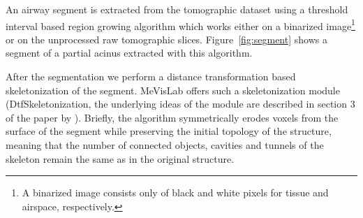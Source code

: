 \documentclass[]{scrartcl}
\begin{document}
An airway segment is extracted from the tomographic dataset using a threshold interval based region growing algorithm which works either on a binarized image\footnote{A binarized image consists only of black and white pixels for tissue and airspace, respectively.} or on the unprocessed raw tomographic slices. Figure~\ref{fig:segment} shows a segment of a partial acinus extracted with this algorithm.

After the segmentation we perform a distance transformation based skeletonization of the segment. MeVisLab offers such a skeletonization module (DtfSkeletonization, the underlying ideas of the module are described in section 3 of the paper by \citet{Selle2001}). Briefly, the algorithm symmetrically erodes voxels from the surface of the segment while preserving the initial topology of the structure, meaning that the number of connected objects, cavities and tunnels of the skeleton remain the same as in the original structure. 
\end{document}
